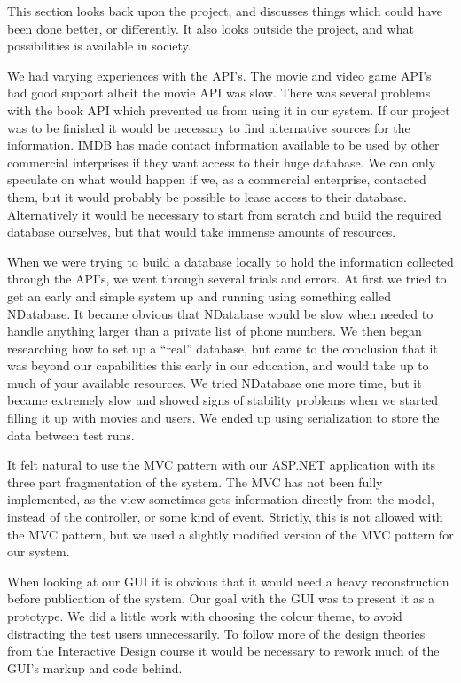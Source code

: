 This section looks back upon the project, and discusses things which could have been done better, or differently. It also looks outside the project, and what possibilities is available in society.

We had varying experiences with the API’s. The movie and video game API's had good support albeit the movie API was slow. There was several problems with the book API which prevented us from using it in our system. If our project was to be finished it would be necessary to find alternative sources for the information. IMDB has made contact information available to be used by other commercial interprises if they want access to their huge database. We can only speculate on what would happen if we, as a commercial enterprise, contacted them, but it would probably be possible to lease access to their database. Alternatively it would be necessary to start from scratch and build the required database ourselves, but that would take immense amounts of resources.

When we were trying to build a database locally to hold the information collected through the API’s, we went through several trials and errors. At first we tried to get an early and simple system up and running using something called NDatabase. It became obvious that NDatabase would be slow when needed to handle anything larger than a private list of phone numbers. We then began researching how to set up a “real” database, but came to the conclusion that it was beyond our capabilities this early in our education, and would take up to much of your available resources. We tried NDatabase one more time, but it became extremely slow and showed signs of stability problems when we started filling it up with movies and users. We ended up using serialization to store the data between test runs.

It felt natural to use the MVC pattern with our ASP.NET application with its three part fragmentation of the system. The MVC has not been fully implemented, as the view sometimes gets information directly from the model, instead of the controller, or some kind of event. Strictly, this is not allowed with the MVC pattern, but we used a slightly modified version of the MVC pattern for our system.     

When looking at our GUI it is obvious that it would need a heavy reconstruction before publication of the system. Our goal with the GUI was to present it as a prototype. We did a little work with choosing the colour theme, to avoid distracting the test users unnecessarily. To follow more of the design theories from the Interactive Design course it would be necessary to rework much of the GUI's markup and code behind.

